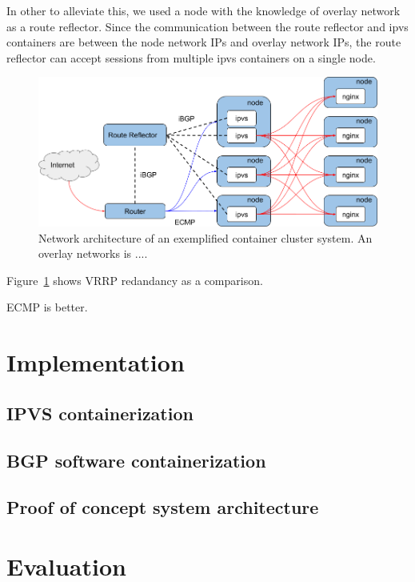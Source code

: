 In other to alleviate this, we used a node with the knowledge of overlay network as a route reflector. 
Since the communication between the route reflector and ipvs containers are between the node network IPs and overlay network IPs, 
the route reflector can accept sessions from multiple ipvs containers on a single node.    

\begin{figure}
\includegraphics[width=\columnwidth]{Figs/ecmp.png}
\caption{Network architecture of an exemplified container cluster system. An overlay networks is .... }
\label{fig:vrrp}
\end{figure}

Figure~\ref{fig:vrrp} shows VRRP redandancy as a comparison.


ECMP is better.

\section{Implementation}\label{Implementation}

\subsection{IPVS containerization}


\subsection{BGP software containerization}

\subsection{Proof of concept system architecture}


\section{Evaluation}\label{Evaluation}

